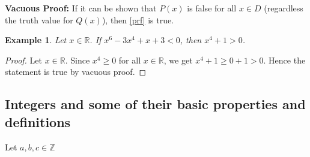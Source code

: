 \documentclass[10pt,reqno]{book}
\theoremstyle{plain}
\newtheorem{example}{Example}
\def\R{\mathbb{R}}
\def\Z{\mathbb{Z}}
\begin{document}
	\noindent \textbf{Vacuous Proof:} If it can be shown that $ P(x) $ is false for all $ x \in D $ (regardless the truth value for $ Q(x) $), then \ref{prf} is true.\\
	
	\begin{example}
		Let $ x \in \R $. If $ x^6 - 3x^4 + x + 3 < 0 $, then $ x^4 + 1 > 0 $.
	\end{example}
	\begin{proof}
		Let $ x \in \R $. Since $ x^4 \geq 0 $ for all $ x \in \R $, we get $ x^4 + 1 \geq 0 + 1 > 0 $. Hence the statement is true by vacuous proof.
	\end{proof}
	
	
	\subsection*{Integers and some of their basic properties and definitions}
	
	Let $ a,b,c \in \Z $
	
\end{document}
